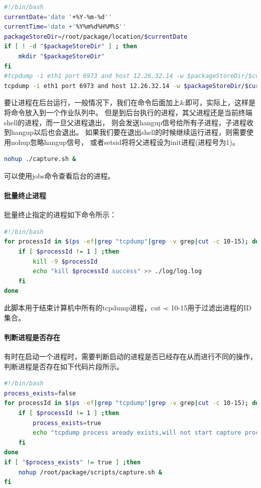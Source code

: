 \documentclass{book}
\begin{document}
\begin{lstlisting}[language=Bash]
#!/bin/bash
currentDate='date '+%Y-%m-%d''
currentTime='date +'%Y%m%d%H%M%S''
packageStoreDir=/root/package/location/$currentDate
if [ ! -d "$packageStoreDir" ] ; then
	mkdir "$packageStoreDir"
fi
#tcpdump -i eth1 port 6973 and host 12.26.32.14 -w $packageStoreDir/$currentTime.cap
tcpdump -i eth1 port 6973 and host 12.26.32.14 -w $packageStoreDir/$currentTime.cap
\end{lstlisting}

要让进程在后台运行，一般情况下，我们在命令后面加上\&即可，实际上，这样是将命令放入到一个作业队列中。
但是到后台执行的进程，其父进程还是当前终端shell的进程，而一旦父进程退出，
则会发送hangup信号给所有子进程，子进程收到hangup以后也会退出。
如果我们要在退出shell的时候继续运行进程，则需要使用nohup忽略hangup信号，
或者setsid将将父进程设为init进程(进程号为1)。

\begin{lstlisting}[language=Bash]
nohup ./capture.sh &
\end{lstlisting}

可以使用jobs命令查看后台的进程。


\paragraph{批量终止进程}批量终止指定的进程如下命令所示：

\begin{lstlisting}[language=Bash]
#!/bin/bash
for processId in $(ps -ef|grep "tcpdump"|grep -v grep|cut -c 10-15); do	
	if [ $processId != 1 ] ;then
		kill -9 $processId
		echo "kill $processId success" >> ./log/log.log
	fi
done
\end{lstlisting}

此脚本用于结束计算机中所有的tcpdump进程，cut -c 10-15用于过滤出进程的ID集合。

\paragraph{判断进程是否存在}

有时在启动一个进程时，需要判断启动的进程是否已经存在从而进行不同的操作，
判断进程是否存在如下代码片段所示。

\begin{lstlisting}[language=Bash]
#!/bin/bash
process_exists=false
for processId in $(ps -ef|grep "tcpdump"|grep -v grep|cut -c 10-15); do
	if [ $processId != 1 ] ;then
		process_exists=true
		echo "tcpdump process aready exists,will not start capture process" >> ./log/capture.log
	fi
done
if [ "$process_exists" != true ] ;then
	nohup /root/package/scripts/capture.sh &
fi
\end{lstlisting}
\end{document}

